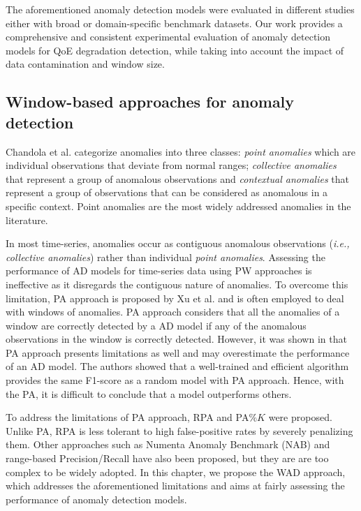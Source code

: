 The aforementioned anomaly detection models were evaluated in different studies \cite{Nkashama2022RobustnessEO, Garg2022AnEO, Cook2020AnomalyDF} either with broad or domain-specific benchmark datasets. Our work provides a comprehensive and consistent experimental evaluation of anomaly detection models for QoE degradation detection, while taking into account the impact of data contamination and window size.


\subsection{Window-based approaches for anomaly detection}\label{window_metrics}
Chandola et al. \cite{chandola2009anomaly} categorize anomalies into three classes: \textit{point anomalies} which are individual observations that deviate from normal ranges; \textit{collective anomalies} that represent a group of anomalous observations and \textit{contextual anomalies} that represent a group of observations that can be considered as anomalous in a specific context. Point anomalies are the most widely addressed anomalies in the literature. %

In most time-series, anomalies occur as contiguous anomalous observations (\textit{i.e., collective anomalies}) rather than individual \textit{point anomalies}. Assessing the performance of AD models for time-series data using \ac{PW} approaches is ineffective as it disregards the contiguous nature of anomalies. To overcome this limitation, \ac{PA} approach is proposed by Xu et al. \cite{xu2018unsupervised} and is often employed \cite{su2019robust,audibert2020usad} to deal with windows of anomalies. PA approach considers that all the anomalies of a window are correctly detected by a AD model if any of the anomalous observations in the window is correctly detected. However, it was shown in \cite{Kim2022TowardsAR, wang2023deep, Hwang2022DoYK} that PA approach presents limitations as well and may overestimate the performance of an AD model. The authors showed that a well-trained and efficient algorithm provides the same F1-score as a random model with PA approach. Hence, with the PA, it is difficult to conclude that a model outperforms others. 

To address the limitations of PA approach, \ac{RPA} \cite{hundman2018detecting} and PA$\%K$ \cite{Kim2022TowardsAR} were proposed. Unlike PA, RPA is less tolerant to high false-positive rates by severely penalizing them. Other approaches such as Numenta Anomaly Benchmark (NAB) \cite{Lavin2015EvaluatingRA} and range-based Precision/Recall \cite{Tatbul2018PrecisionAR} have also been proposed, but they are are too complex to be widely adopted. In this chapter, we propose the WAD approach, which addresses the aforementioned limitations and aims at fairly assessing the performance of anomaly detection models.